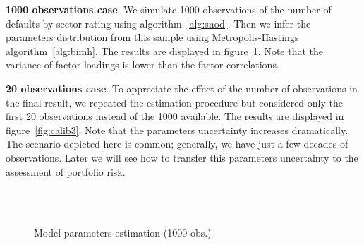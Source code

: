 \documentclass[11pt,fleqn]{book} %
\begin{document}
\begin{example}
	\textbf{1000 observations case}. We simulate \num{1000} observations 
	of the number of defaults by sector-rating using algorithm~\ref{alg:snod}. 
	Then we infer the parameters distribution from this sample using 
	Metropolis-Hastings algorithm~\ref{alg:bimh}. The results are displayed in 
	figure~\ref{fig:calib1}. Note that the variance of factor loadings is 
	lower than the factor correlations.

	\textbf{20 observations case}. To appreciate the effect of the number of 
	observations in the final result, we repeated the estimation procedure 
	but considered only the first 20 observations instead of the \num{1000}
	available. The results are displayed in figure~\ref{fig:calib3}. Note 
	that the parameters uncertainty increases dramatically. The scenario 
	depicted here is common; generally, we have just a few decades of 
	observations. Later we will see how to transfer this parameters 
	uncertainty to the assessment of portfolio risk.
\end{example}

\begin{figure}[!h]
	\centering
	\hfill
	\\
	\\
	\caption{Model parameters estimation (1000 obs.)}
	\label{fig:calib1}
\end{figure}
\end{document}
